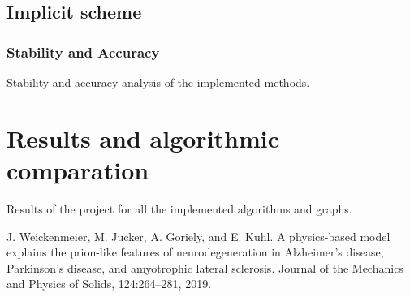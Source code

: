 \documentclass[12pt, letterpaper]{article}
\begin{document}
\subsection{Implicit scheme}
\subsubsection{Stability and Accuracy}

Stability and accuracy analysis of the implemented methods.

\section{Results and algorithmic comparation}
Results of the project for all the implemented algorithms and graphs.

\begin{thebibliography}{9}
    J. Weickenmeier, M. Jucker, A. Goriely, and E. Kuhl. A physics-based model explains the prion-like features of neurodegeneration in Alzheimer’s disease, Parkinson’s disease, and amyotrophic lateral sclerosis. Journal of the Mechanics and
    Physics of Solids, 124:264–281, 2019.
\end{thebibliography}
\end{document}
